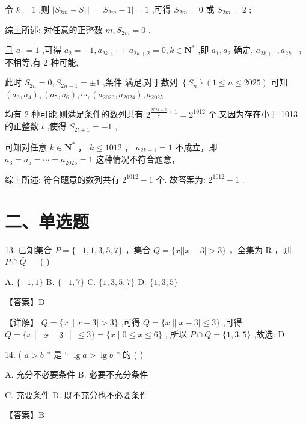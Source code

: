 \documentclass[10pt]{article}
\newcommand*\circled[1]{\tikz[baseline=(char.base)]{\node[shape=circle,draw,inner sep=1.5pt] (char) {\small #1};}}
\begin{document}
令 \(k = 1\) ,则 \(\left| {{S}_{2m} - {S}_{1}}\right|  = \left| {{S}_{2m} - 1}\right|  = 1\) ,可得 \({S}_{2m} = 0\) 或 \({S}_{2m} = 2\) ;

综上所述: 对任意的正整数 \(m,{S}_{2m} = 0\) .

且 \({a}_{1} = 1\) ,可得 \({a}_{2} =  - 1,{a}_{{2k} + 1} + {a}_{{2k} + 2} = 0,k \in  {\mathbf{N}}^{ * }\) ,即 \({a}_{1},{a}_{2}\) 确定, \({a}_{{2k} + 1},{a}_{{2k} + 2}\) 不相等,有 2 种可能,

此时 \({S}_{2n} = 0,{S}_{{2n} - 1} =  \pm  1\) ,条件 \circled{2} 满足,对于数列 \(\left\{  {S}_{n}\right\}  \left( {1 \leq  n \leq  {2025}}\right)\) 可知: \(\left( {{a}_{3},{a}_{4}}\right) ,\left( {{a}_{5},{a}_{6}}\right) ,\cdots ,\left( {{a}_{2023},{a}_{2024}}\right) ,{a}_{2025}\)

均有 2 种可能,则满足条件的数列共有 \({2}^{\frac{{2024} - 2}{2} + 1} = {2}^{1012}\) 个,又因为存在小于 1013 的正整数 \(t\) ,使得 \({S}_{{2t} + 1} =  - 1\) ,

可知对任意 \(k \in  {\mathbf{N}}^{ * }\) ， \(k \leq  {1012}\) ， \({a}_{{2k} + 1} = 1\) 不成立，即 \({a}_{3} = {a}_{5} = \cdots  = {a}_{2025} = 1\) 这种情况不符合题意，

综上所述: 符合题意的数列共有 \({2}^{1012} - 1\) 个. 故答案为: \({2}^{1012} - 1\) .

\section*{二、单选题}

13. 已知集合 \(P = \{  - 1,1,3,5,7\}\) ，集合 \(Q = \{ x\left| \right| x - 3 \mid   > 3\}\) ，全集为 \(\mathrm{R}\) ，则 \(P \cap  \bar{Q} =\) ( )

A. \(\{  - 1,1\}\) B. \(\{  - 1,7\}\) C. \(\{ 1,3,5,7\}\) D. \(\{ 1,3,5\}\)

【答案】D

【详解】 \(Q = \{ x\left.\parallel  {x - 3}\right|  > 3\}\) ,可得 \(\bar{Q} = \{ x\parallel x - 3 \mid   \leq  3\}\) ,可得: \(\bar{Q} = \{ x\begin{Vmatrix}{x - 3}\end{Vmatrix} \leq  3\}  = \{ x \mid  0 \leq  x \leq  6\}\) , 所以 \(P \cap  \bar{Q} = \{ 1,3,5\}\) ,故选: D

14. ( \(a > b\) ” 是 “ \(\lg a > \lg b\) ” 的 ( )

A. 充分不必要条件 B. 必要不充分条件

C. 充要条件 D. 既不充分也不必要条件

【答案】B
\end{document}
